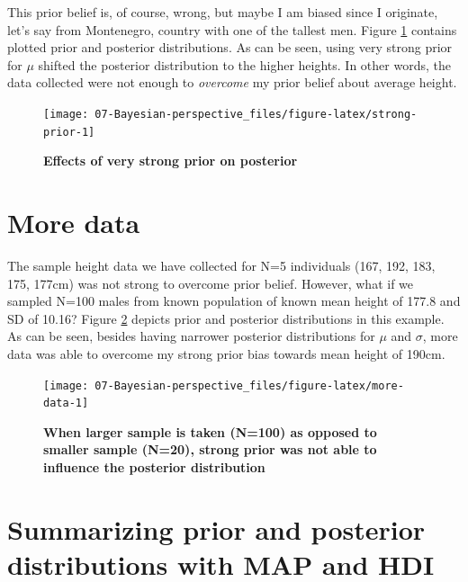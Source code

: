 \documentclass[
]{book}
\begin{document}
This prior belief is, of course, wrong, but maybe I am biased since I originate, let's say from Montenegro, country with one of the tallest men. Figure \ref{fig:strong-prior} contains plotted prior and posterior distributions. As can be seen, using very strong prior for \(\mu\) shifted the posterior distribution to the higher heights. In other words, the data collected were not enough to \emph{overcome} my prior belief about average height.

\begin{figure}

{\centering \texttt{[image: 07-Bayesian-perspective\_files/figure-latex/strong-prior-1]} 

}

\caption{\textbf{Effects of very strong prior on posterior}}\label{fig:strong-prior}
\end{figure}



\hypertarget{more-data}{%
\section{More data}\label{more-data}}

The sample height data we have collected for N=5 individuals (167, 192, 183, 175, 177cm) was not strong to overcome prior belief. However, what if we sampled N=100 males from known population of known mean height of 177.8 and SD of 10.16? Figure \ref{fig:more-data} depicts prior and posterior distributions in this example. As can be seen, besides having narrower posterior distributions for \(\mu\) and \(\sigma\), more data was able to overcome my strong prior bias towards mean height of 190cm.

\begin{figure}

{\centering \texttt{[image: 07-Bayesian-perspective\_files/figure-latex/more-data-1]} 

}

\caption{\textbf{When larger sample is taken (N=100) as opposed to smaller sample (N=20), strong prior was not able to influence the posterior distribution}}\label{fig:more-data}
\end{figure}



\hypertarget{summarizing-prior-and-posterior-distributions-with-map-and-hdi}{%
\section{Summarizing prior and posterior distributions with MAP and HDI}\label{summarizing-prior-and-posterior-distributions-with-map-and-hdi}}
\end{document}
